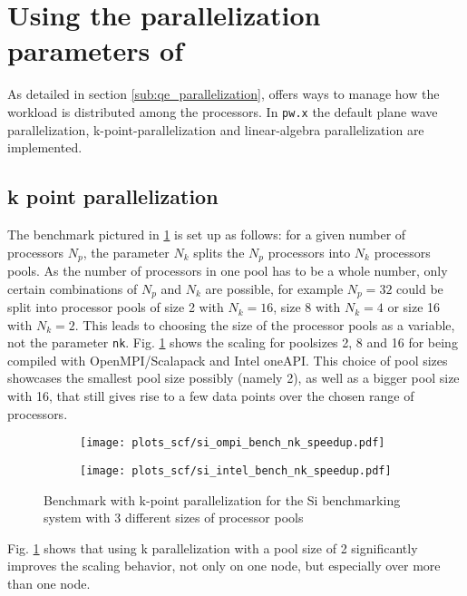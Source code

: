 \documentclass[main.tex]{subfiles}
\begin{document}
\section{Using the parallelization parameters of \QE}

As detailed in section \ref{sub:qe_parallelization}, \QE offers ways to manage how the workload is distributed among the processors.
In \texttt{pw.x} the default plane wave parallelization, k-point-parallelization and linear-algebra parallelization are implemented.

\subsection{k point parallelization}

The benchmark pictured in \ref{fig:scaling_scf_nk_si} is set up as follows: for a given number of processors \(N_p\), the parameter \(N_k\) splits the \(N_p\) processors into \(N_k\) processors pools.
As the number of processors in one pool has to be a whole number, only certain combinations of \(N_p\) and \(N_k\) are possible, for example \(N_p = 32\) could be split into processor pools of size 2 with \(N_k = 16\), size 8 with \(N_k = 4\) or size 16 with \(N_k = 2\).
This leads to choosing the size of the processor pools as a variable, not the parameter \texttt{nk}.
Fig. \ref{fig:scaling_scf_nk_si} shows the scaling for poolsizes 2, 8 and 16 for \QE being compiled with OpenMPI/Scalapack and Intel oneAPI.
This choice of pool sizes showcases the smallest pool size possibly (namely 2), as well as a bigger pool size with 16, that still gives rise to a few data points over the chosen range of processors.

\begin{figure}[ht!]
\begin{subfigure}[b]{0.49\textwidth}
    \centering
    \texttt{[image: plots\_scf/si\_ompi\_bench\_nk\_speedup.pdf]}
\end{subfigure}
\begin{subfigure}[b]{0.49\textwidth}
    \centering
    \texttt{[image: plots\_scf/si\_intel\_bench\_nk\_speedup.pdf]}
\end{subfigure}
\caption{Benchmark with k-point parallelization for the Si benchmarking system with 3 different sizes of processor pools}
\label{fig:scaling_scf_nk_si}
\end{figure}

Fig. \ref{fig:scaling_scf_nk_si} shows that using k parallelization with a pool size of 2 significantly improves the scaling behavior, not only on one node, but especially over more than one node.
\end{document}
